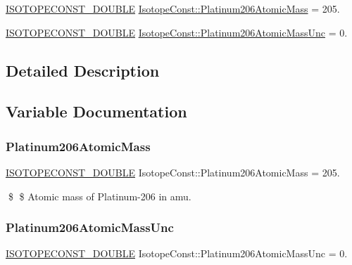 \begin{DoxyCompactItemize}
\item 
\mbox{\hyperlink{group___isotope_const-_macros_ga8f45a7272ce02c0b4c65c44636ed719a}{I\+S\+O\+T\+O\+P\+E\+C\+O\+N\+S\+T\+\_\+\+D\+O\+U\+B\+LE}} \mbox{\hyperlink{group___isotope_const-_platinum-_pt206_ga6acb245f9a623b27bb571296551d5a00}{Isotope\+Const\+::\+Platinum206\+Atomic\+Mass}} = 205.
\item 
\mbox{\hyperlink{group___isotope_const-_macros_ga8f45a7272ce02c0b4c65c44636ed719a}{I\+S\+O\+T\+O\+P\+E\+C\+O\+N\+S\+T\+\_\+\+D\+O\+U\+B\+LE}} \mbox{\hyperlink{group___isotope_const-_platinum-_pt206_ga61f7aeb491636635bc5d85e68dee1949}{Isotope\+Const\+::\+Platinum206\+Atomic\+Mass\+Unc}} = 0.
\end{DoxyCompactItemize}


\subsection{Detailed Description}


\subsection{Variable Documentation}
\mbox{\label{group___isotope_const-_platinum-_pt206_ga6acb245f9a623b27bb571296551d5a00}} 
\subsubsection{\texorpdfstring{Platinum206\+Atomic\+Mass}{Platinum206AtomicMass}}
{\footnotesize\ttfamily \mbox{\hyperlink{group___isotope_const-_macros_ga8f45a7272ce02c0b4c65c44636ed719a}{I\+S\+O\+T\+O\+P\+E\+C\+O\+N\+S\+T\+\_\+\+D\+O\+U\+B\+LE}} Isotope\+Const\+::\+Platinum206\+Atomic\+Mass = 205.}

\$ \$ Atomic mass of Platinum-\/206 in amu. \mbox{\label{group___isotope_const-_platinum-_pt206_ga61f7aeb491636635bc5d85e68dee1949}} 
\subsubsection{\texorpdfstring{Platinum206\+Atomic\+Mass\+Unc}{Platinum206AtomicMassUnc}}
{\footnotesize\ttfamily \mbox{\hyperlink{group___isotope_const-_macros_ga8f45a7272ce02c0b4c65c44636ed719a}{I\+S\+O\+T\+O\+P\+E\+C\+O\+N\+S\+T\+\_\+\+D\+O\+U\+B\+LE}} Isotope\+Const\+::\+Platinum206\+Atomic\+Mass\+Unc = 0.}

